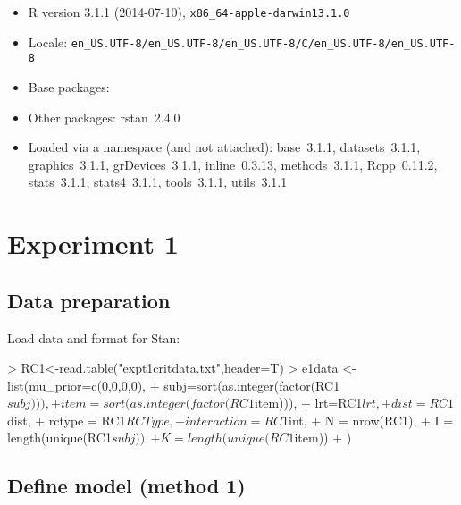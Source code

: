 \documentclass{article}
\begin{document}
\begin{itemize}\raggedright
  \item R version 3.1.1 (2014-07-10), \verb|x86_64-apple-darwin13.1.0|
  \item Locale: \verb|en_US.UTF-8/en_US.UTF-8/en_US.UTF-8/C/en_US.UTF-8/en_US.UTF-8|
  \item Base packages:
  \item Other packages: rstan~2.4.0
  \item Loaded via a namespace (and not attached): base~3.1.1,
    datasets~3.1.1, graphics~3.1.1, grDevices~3.1.1, inline~0.3.13,
    methods~3.1.1, Rcpp~0.11.2, stats~3.1.1, stats4~3.1.1, tools~3.1.1,
    utils~3.1.1
\end{itemize}

\section{Experiment 1}

\subsection{Data preparation}

Load data and format for Stan:

\begin{Schunk}
\begin{Sinput}
> RC1<-read.table("expt1critdata.txt",header=T)
> e1data <- list(mu_prior=c(0,0,0,0),
+              subj=sort(as.integer(factor(RC1$subj))),
+              item=sort(as.integer(factor(RC1$item))),
+              lrt=RC1$lrt,
+              dist = RC1$dist,
+              rctype = RC1$RCType,
+              interaction = RC1$int,
+              N = nrow(RC1),
+              I = length(unique(RC1$subj)),
+              K = length(unique(RC1$item))
+ )  
\end{Sinput}
\end{Schunk}

\subsection{Define model (method 1)}
\end{document}
